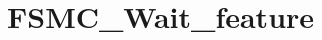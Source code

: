 \hypertarget{group___f_s_m_c___wait__feature}{\section{F\-S\-M\-C\-\_\-\-Wait\-\_\-feature}
\label{group___f_s_m_c___wait__feature}
}
